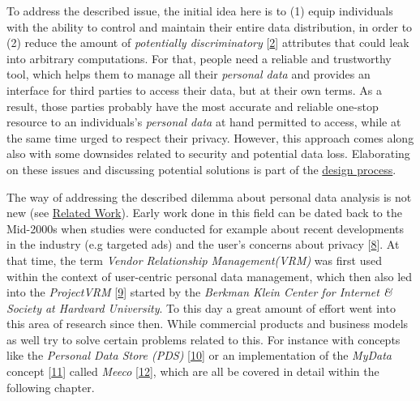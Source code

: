 \documentclass[12pt,english,a4paper,titlepage,cleardoublepage=empty,dottedtoc]{report}
\begin{document}
To address the described issue, the initial idea here is to (1) equip
individuals with the ability to control and maintain their entire data
distribution, in order to (2) reduce the amount of \emph{potentially
discriminatory}
{[}\protect\hyperlink{ref-paper_2008_discrimination-aware-data-mining}{2}{]}
attributes that could leak into arbitrary computations. For that, people
need a reliable and trustworthy tool, which helps them to manage all
their \emph{personal data} and provides an interface for third parties
to access their data, but at their own terms. As a result, those parties
probably have the most accurate and reliable one-stop resource to an
individuals's \emph{personal data} at hand permitted to access, while at
the same time urged to respect their privacy. However, this approach
comes along also with some downsides related to security and potential
data loss. Elaborating on these issues and discussing potential
solutions is part of the \protect\hyperlink{design-discussion}{design
process}.

The way of addressing the described dilemma about personal data analysis
is not new (see \protect\hyperlink{related-work}{Related Work}). Early
work done in this field can be dated back to the Mid-2000s when studies
were conducted for example about recent developments in the industry
(e.g targeted ads) and the user's concerns about privacy
{[}\protect\hyperlink{ref-study_2004_architecture-for-privacy-sensitive-ubiquitous-computing}{8}{]}.
At that time, the term \emph{Vendor Relationship Management(VRM)} was
first used within the context of user-centric personal data management,
which then also led into the \emph{ProjectVRM}
{[}\protect\hyperlink{ref-web_2010_projectvrm_about}{9}{]} started by
the \emph{Berkman Klein Center for Internet \& Society at Hardvard
University}. To this day a great amount of effort went into this area of
research since then. While commercial products and business models as
well try to solve certain problems related to this. For instance with
concepts like the \emph{Personal Data Store (PDS)}
{[}\protect\hyperlink{ref-paper_2013_the-personal-data-store-approach-to-personal-data-security_2013}{10}{]}
or an implementation of the \emph{MyData} concept
{[}\protect\hyperlink{ref-whitepaper_2014_mydata-a-nordic-model-for-human-centered-personal-data-management-and-processing}{11}{]}
called \emph{Meeco}
{[}\protect\hyperlink{ref-web_2016_meeco-how-it-works}{12}{]}, which are
all be covered in detail within the following chapter.
\end{document}
